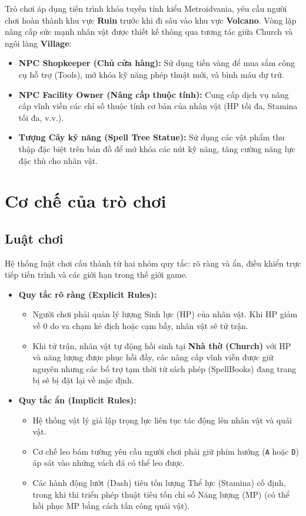 \documentclass[../DoAn.tex]{subfiles}
\begin{document}
Trò chơi áp dụng tiến trình khóa tuyến tính kiểu Metroidvania, yêu cầu người chơi hoàn thành khu vực \textbf{Ruin} trước khi đi sâu vào khu vực \textbf{Volcano}. Vòng lặp nâng cấp sức mạnh nhân vật được thiết kế thông qua tương tác giữa Church và ngôi làng \textbf{Village}:
\begin{itemize}
    \item \textbf{NPC Shopkeeper (Chủ cửa hàng):} Sử dụng tiền vàng để mua sắm công cụ hỗ trợ (Tools), mở khóa kỹ năng phép thuật mới, và bình máu dự trữ.
    \item \textbf{NPC Facility Owner (Nâng cấp thuộc tính):} Cung cấp dịch vụ nâng cấp vĩnh viễn các chỉ số thuộc tính cơ bản của nhân vật (HP tối đa, Stamina tối đa, v.v.).
    \item \textbf{Tượng Cây kỹ năng (Spell Tree Statue):} Sử dụng các vật phẩm thu thập đặc biệt trên bản đồ để mở khóa các nút kỹ năng, tăng cường năng lực đặc thù cho nhân vật.
\end{itemize}

\section{Cơ chế của trò chơi}
\label{section:design:3.3}

\subsection{Luật chơi}
\label{subsection:3.3.1}

Hệ thống luật chơi cấu thành từ hai nhóm quy tắc: rõ ràng và ẩn, điều khiển trực tiếp tiến trình và các giới hạn trong thế giới game.
\begin{itemize}
    \item \textbf{Quy tắc rõ ràng (Explicit Rules):}
    \begin{itemize}
        \item Người chơi phải quản lý lượng Sinh lực (HP) của nhân vật. Khi HP giảm về 0 do va chạm kẻ địch hoặc cạm bẫy, nhân vật sẽ tử trận.
        \item Khi tử trận, nhân vật tự động hồi sinh tại \textbf{Nhà thờ (Church)} với HP và năng lượng được phục hồi đầy, các nâng cấp vĩnh viễn được giữ nguyên nhưng các bổ trợ tạm thời từ sách phép (SpellBooks) đang trang bị sẽ bị đặt lại về mặc định.
    \end{itemize}
    \item \textbf{Quy tắc ẩn (Implicit Rules):}
    \begin{itemize}
        \item Hệ thống vật lý giả lập trọng lực liên tục tác động lên nhân vật và quái vật.
        \item Cơ chế leo bám tường yêu cầu người chơi phải giữ phím hướng (\texttt{A} hoặc \texttt{D}) áp sát vào những vách đá có thể leo được.
        \item Các hành động lướt (Dash) tiêu tốn lượng Thể lực (Stamina) cố định, trong khi thi triển phép thuật tiêu tốn chỉ số Năng lượng (MP) (có thể hồi phục MP bằng cách tấn công quái vật).
    \end{itemize}
\end{itemize}
\end{document}
